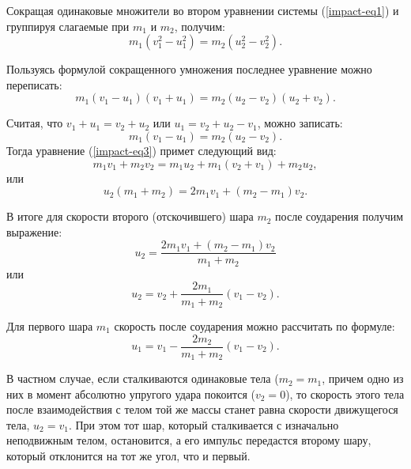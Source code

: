 \documentclass[All.tex]{subfiles}
\begin{document}
Сокращая одинаковые множители во втором уравнении системы (\ref{impact-eq1}) и группируя слагаемые при $ m_1 $ и $ m_2 $, получим:
\begin{equation}\label{impact-eq2}
m_{1}(v_{1}^{2} - u_{1}^{2}) = m_{2}(u_{2}^{2} - v_{2}^{2}).
\end{equation}

Пользуясь формулой сокращенного умножения последнее уравнение можно переписать:
\begin{equation}\label{impact-eq3}
m_{1}(v_{1} - u_{1})(v_{1} + u_{1}) = m_{2}(u_{2} - v_{2})(u_{2} + v_{2}).
\end{equation}

Считая, что $ v_{1} + u_{1} = v_{2} + u_{2}  $ или $ u_{1} = v_{2} + u_{2} - v_{1} $, можно записать:
\begin{equation}\label{impact-eq4}
m_{1}(v_{1} - u_{1}) = m_{2}(u_{2} - v_{2}).
\end{equation}
Тогда уравнение (\ref{impact-eq3}) примет следующий вид:
\begin{equation}\label{impact-eq5}
m_{1}v_{1} + m_{2}v_{2} = m_{1}u_{2} + m_{1} (v_{2} + v_{1}) + m_{2}u_{2},
\end{equation}
или
\begin{equation}\label{impact-eq6}
u_{2} (m_{1}+m_{2}) = 2m_{1}v_{1} + (m_{2}-m_{1})v_{2}.
\end{equation}

В итоге для скорости второго (отскочившего) шара $ m_{2} $ после соударения получим выражение:
\begin{equation}\label{impact-eq7}
u_{2} = \frac{ 2m_{1}v_{1} + (m_{2}-m_{1})v_{2}}{m_{1}+m_{2}}
\end{equation}
или
\begin{equation}\label{impact-eq8}
u_{2} = v_{2} + \frac{ 2m_{1}}{m_{1}+m_{2}} (v_{1}-v_{2}).
\end{equation}

Для первого шара $ m_{1} $ скорость после соударения можно рассчитать по формуле:
\begin{equation}\label{impact-eq9}
u_{1} = v_{1} - \frac{ 2m_{2}}{m_{1}+m_{2}} (v_{1}-v_{2}).
\end{equation}

В частном случае, если сталкиваются одинаковые тела ($ m_{2}=m_{1} $, причем одно из них в момент абсолютно упругого удара покоится ($ v_{2}=0 $), то скорость этого тела после взаимодействия с телом той же массы станет равна скорости движущегося тела, $ u_{2}=v_{1} $.
При этом тот шар, который сталкивается с изначально неподвижным телом, остановится, а его импульс передастся второму шару, который отклонится на тот же угол, что и первый.
\end{document}
